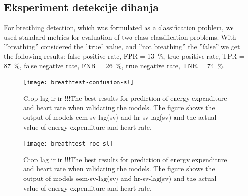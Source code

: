 \subsection{Eksperiment detekcije dihanja}

For breathing detection, which was formulated as a classification problem, we used standard metrics for evaluation of two-class classification problems. With ''breathing'' considered the ''true'' value, and ''not breathing'' the ''false'' we get the following results: false positive rate, FPR = \SI{13}{\%}, true positive rate, TPR = \SI{87}{\%}, false negative rate, FNR = \SI{26}{\%}, true negative rate, TNR = \SI{74}{\%}.


\begin{figure}[!htbp]
	\centering
	\texttt{[image: breathtest-confusion-sl]}
	\caption{Crop lag ir ir !!!The best results for prediction of energy expenditure and heart rate when validating the models. The figure shows the output of models eem-sv-lag(sv) and hr-sv-lag(sv) and the actual value of energy expenditure and heart rate.}
	\label{fig:breathtest-confusion}
\end{figure}

\begin{figure}[!htbp]
	\centering
	\texttt{[image: breathtest-roc-sl]}
	\caption{Crop lag ir ir !!!The best results for prediction of energy expenditure and heart rate when validating the models. The figure shows the output of models eem-sv-lag(sv) and hr-sv-lag(sv) and the actual value of energy expenditure and heart rate.}
	\label{fig:breathtest-roc}
\end{figure}




























